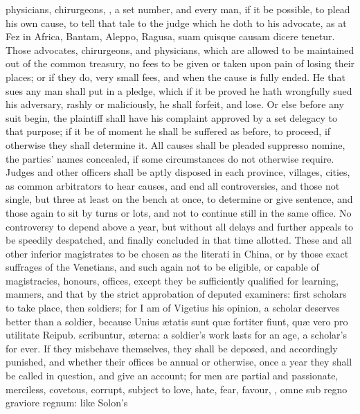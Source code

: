 {physicians, chirurgeons, \etc{}, a set number, and every man, if it
be possible, to plead his own cause, to tell that tale to the judge
which he doth to his advocate, as at Fez in Africa, Bantam, Aleppo,
Ragusa, suam quisque causam dicere tenetur. Those advocates,
chirurgeons, and physicians, which are allowed to be maintained
out of the common treasury, no fees to be given or taken upon pain
of losing their places; or if they do, very small fees, and when the
cause is fully ended. He that sues any man shall put in a
pledge, which if it be proved he hath wrongfully sued his adversary,
rashly or maliciously, he shall forfeit, and lose. Or else before any
suit begin, the plaintiff shall have his complaint approved by a set
delegacy to that purpose; if it be of moment he shall be suffered as
before, to proceed, if otherwise they shall determine it. All causes
shall be pleaded suppresso nomine, the parties' names concealed, if
some circumstances do not otherwise require. Judges and other officers
shall be aptly disposed in each province, villages, cities, as common
arbitrators to hear causes, and end all controversies, and those not
single, but three at least on the bench at once, to determine or give
sentence, and those again to sit by turns or lots, and not to continue
still in the same office. No controversy to depend above a year, but
without all delays and further appeals to be speedily despatched, and
finally concluded in that time allotted. These and all other inferior
magistrates to be chosen as the literati in China, or by those
exact suffrages of the Venetians, and such again not to be
eligible, or capable of magistracies, honours, offices, except they be
sufficiently qualified for learning, manners, and that by the
strict approbation of deputed examiners: first scholars to take
place, then soldiers; for I am of Vigetius his opinion, a scholar
deserves better than a soldier, because Unius \ae{}tatis sunt qu\ae{}
fortiter fiunt, qu\ae{} vero pro utilitate Reipub. scribuntur, \ae{}terna: a
soldier's work lasts for an age, a scholar's for ever. If they
misbehave themselves, they shall be deposed, and accordingly
punished, and whether their offices be annual or otherwise, once a
year they shall be called in question, and give an account; for men are
partial and passionate, merciless, covetous, corrupt, subject to love,
hate, fear, favour, \etc{}, omne sub regno graviore regnum: like Solon's
}
